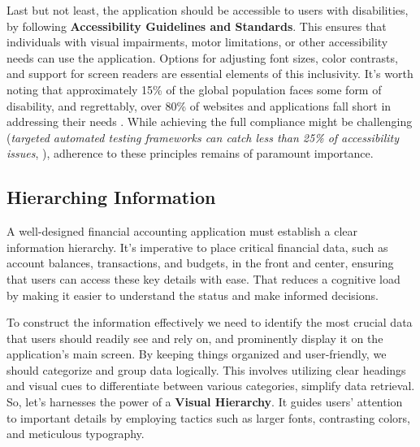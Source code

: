 Last but not least, the application should be accessible to users with disabilities, by following \textbf{Accessibility 
Guidelines and Standards}. This ensures that individuals with visual impairments, motor limitations, or other 
accessibility needs can use the application. Options for adjusting font sizes, color contrasts, and support for 
screen readers are essential elements of this inclusivity. It's worth noting that approximately 15\% of the global 
population faces some form of disability, and regrettably, over 80\% of websites and applications fall short in 
addressing their needs \cite{Worl11}. While achieving the full compliance might be challenging (\emph{targeted 
automated testing frameworks can catch less than 25\% of accessibility issues}, \cite{Univ22}), adherence to these 
principles remains of paramount importance.


\subsection{Hierarching Information}

A well-designed financial accounting application must establish a clear information hierarchy. It's imperative to place 
critical financial data, such as account balances, transactions, and budgets, in the front and center, ensuring that 
users can access these key details with ease. That reduces a cognitive load by making it easier to understand the status 
and make informed decisions.

To construct the information effectively we need to identify the most crucial data that users should readily see and 
rely on, and prominently display it on the application's main screen. By keeping things organized and user-friendly, 
we should categorize and group data logically. This involves utilizing clear headings and visual cues to differentiate 
between various categories, simplify data retrieval. So, let's harnesses the power of a \textbf{Visual Hierarchy}. 
It guides users' attention to important details by employing tactics such as larger fonts, contrasting colors, and 
meticulous typography. 

